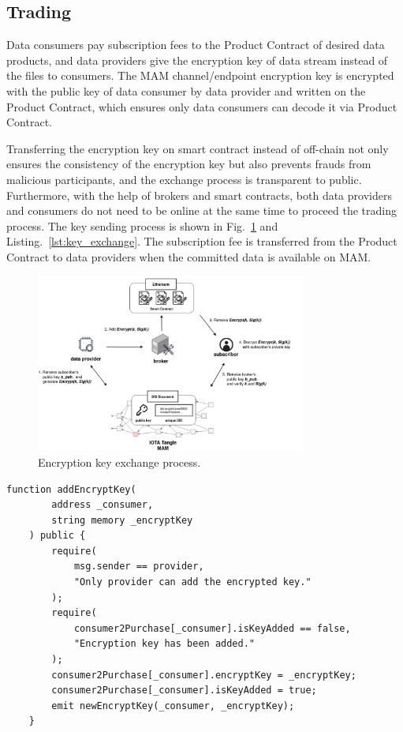 \documentclass[conference]{IEEEtran}
\begin{document}
\subsection{Trading}
Data consumers pay subscription fees to the Product Contract of desired data products, and data providers give the encryption key of data stream instead of the files to consumers. The MAM channel/endpoint encryption key is encrypted with the public key of data consumer by data provider and written on the Product Contract, which ensures only data consumers can decode it via Product Contract.

Transferring the encryption key on smart contract instead of off-chain not only ensures the consistency of the encryption key but also prevents frauds from malicious participants, and the exchange process is transparent to public. Furthermore, with the help of brokers and smart contracts, both data providers and consumers do not need to be online at the same time to proceed the trading process. The key sending process is shown in Fig.~\ref{fig:key_exchange} and Listing.~\ref{lst:key_exchange}. The subscription fee is transferred from the Product Contract to data providers when the committed data is available on MAM.

\begin{figure}[!t]
    \centering
    \includegraphics[width=3.5in]{key_exchange}
    \caption{Encryption key exchange process.}
    \label{fig:key_exchange}
\end{figure}

\lstset{style=solidity}

\begin{lstlisting}[caption={Add encryption key to data consumers}, label={lst:key_exchange}, frame=single]
    function addEncryptKey(
        address _consumer,
        string memory _encryptKey
    ) public {
        require(
            msg.sender == provider,
            "Only provider can add the encrypted key."
        );
        require(
            consumer2Purchase[_consumer].isKeyAdded == false,
            "Encryption key has been added."
        );
        consumer2Purchase[_consumer].encryptKey = _encryptKey;
        consumer2Purchase[_consumer].isKeyAdded = true;
        emit newEncryptKey(_consumer, _encryptKey);
    }
\end{lstlisting}
\end{document}
